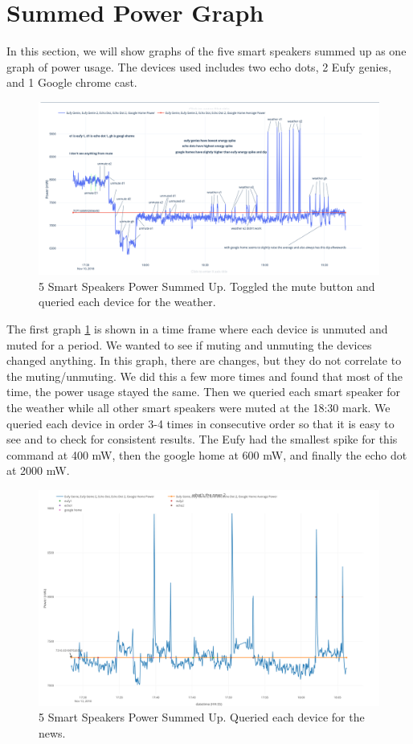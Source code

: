 \section{Summed Power Graph}
\label{sumPowerGraph}
In this section, we will show graphs of the five smart speakers summed up as one graph of power usage. The devices used includes two echo dots, 2 Eufy genies, and 1 Google chrome cast.

\begin{figure}[H]
  \centering
  \includegraphics[width=1\textwidth]{figures/weatherSum.png}
  \caption{5 Smart Speakers Power Summed Up. Toggled the mute button and queried each device for the weather.}
  \label{fig:weatherSum}
\end{figure}

The first graph \ref{fig:weatherSum} is shown in a time frame where each device is unmuted and muted for a period. We wanted to see if muting and unmuting the devices changed anything. In this graph, there are changes, but they do not correlate to the muting/unmuting. We did this a few more times and found that most of the time, the power usage stayed the same. Then we queried each smart speaker for the weather while all other smart speakers were muted at the 18:30 mark. We queried each device in order 3-4 times in consecutive order so that it is easy to see and to check for consistent results. The Eufy had the smallest spike for this command at 400 mW, then the google home at 600 mW, and finally the echo dot at 2000 mW.

\begin{figure}[H]
  \centering
  \includegraphics[width=1\textwidth]{figures/mixedNewsSum.png}
  \caption{5 Smart Speakers Power Summed Up. Queried each device for the
  news.}
  \label{fig:mixedNewsSum}
\end{figure}

